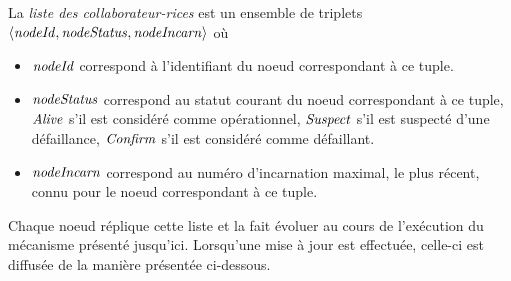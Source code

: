 \begin{definition}
  \label{def:collaborator-list}
  La \emph{liste des collaborateur-rices} est un ensemble de triplets $\langle \mathit{nodeId},\mathit{nodeStatus},\mathit{nodeIncarn} \rangle$ où
  \begin{itemize}
    \item $\mathit{nodeId}$ correspond à l'identifiant du noeud correspondant à ce tuple.
    \item $\mathit{nodeStatus}$ correspond au statut courant du noeud correspondant à ce tuple, \ie $\mathit{Alive}$ s'il est considéré comme opérationnel, $\mathit{Suspect}$ s'il est suspecté d'une défaillance, $\mathit{Confirm}$ s'il est considéré comme défaillant.
    \item $\mathit{nodeIncarn}$ correspond au numéro d'incarnation maximal, \ie le plus récent, connu pour le noeud correspondant à ce tuple.
  \end{itemize}
\end{definition}

Chaque noeud réplique cette liste et la fait évoluer au cours de l'exécution du mécanisme présenté jusqu'ici.
Lorsqu'une mise à jour est effectuée, celle-ci est diffusée de la manière présentée ci-dessous.
